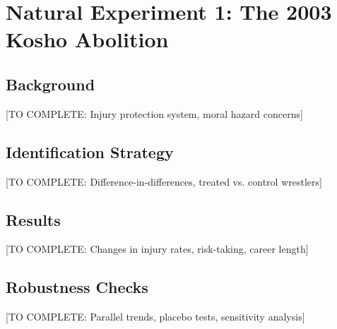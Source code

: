 \section{Natural Experiment 1: The 2003 Kosho Abolition}

\subsection{Background}

[TO COMPLETE: Injury protection system, moral hazard concerns]

\subsection{Identification Strategy}

[TO COMPLETE: Difference-in-differences, treated vs. control wrestlers]

\subsection{Results}

[TO COMPLETE: Changes in injury rates, risk-taking, career length]

\subsection{Robustness Checks}

[TO COMPLETE: Parallel trends, placebo tests, sensitivity analysis]